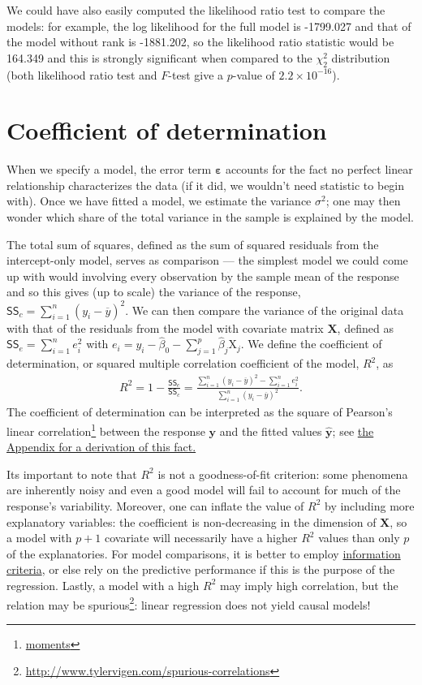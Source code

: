 \documentclass[
  11pt,
  letterpaper,
]{book}
\renewcommand{\href}[2]{#2\footnote{\url{#1}}}
\theoremstyle{definition}
\theoremstyle{definition}
\theoremstyle{definition}
\theoremstyle{definition}
\theoremstyle{remark}
\begin{document}
We could have also easily computed the likelihood ratio test to compare the models: for example, the log likelihood for the full model is -1799.027 and that of the model without rank is -1881.202, so the likelihood ratio statistic would be 164.349 and this is strongly significant when compared to the \(\chi^2_2\) distribution (both likelihood ratio test and \(F\)-test give a \(p\)-value of \(2.2 \times 10^{-16}\)).

\hypertarget{coefR2}{%
\section{Coefficient of determination}\label{coefR2}}

When we specify a model, the error term \(\boldsymbol{\varepsilon}\) accounts for the fact no perfect linear relationship characterizes the data (if it did, we wouldn't need statistic to begin with). Once we have fitted a model, we estimate the variance \(\sigma^2\); one may then wonder which share of the total variance in the sample is explained by the model.

The total sum of squares, defined as the sum of squared residuals from the intercept-only model, serves as comparison --- the simplest model we could come up with would involving every observation by the sample mean of the response and so this gives (up to scale) the variance of the response, \(\mathsf{SS}_c = \sum_{i=1}^n (y_i - \overline{y})^2\). We can then compare the variance of the original data with that of the residuals from the model with covariate matrix \(\mathbf{X}\), defined as \(\mathsf{SS}_e =\sum_{i=1}^n e_i^2\) with \(e_i = y_i - \widehat{\beta}_0 - \sum_{j=1}^p \widehat{\beta}_j\mathrm{X}_j\).
We define the coefficient of determination, or squared multiple correlation coefficient of the model, \(R^2\), as
\begin{align*}
R^2 = 1- \frac{\mathsf{SS}_e}{\mathsf{SS}_c} = \frac{\sum_{i=1}^n (y_i - \overline{y})^2- \sum_{i=1}^n e_i^2}{\sum_{i=1}^n (y_i - \overline{y})^2}.
\end{align*}
The coefficient of determination can be interpreted as the square of \href{moments}{Pearson's linear correlation} between the response \(\boldsymbol{y}\) and the fitted values \(\widehat{\boldsymbol{y}}\); see \protect\hyperlink{derivationR2}{the Appendix for a derivation of this fact.}

Its important to note that \(R^2\) is not a goodness-of-fit criterion: some phenomena are inherently noisy and even a good model will fail to account for much of the response's variability. Moreover, one can inflate the value of \(R^2\) by including more explanatory variables: the coefficient is non-decreasing in the dimension of \(\mathbf{X}\), so a model with \(p+1\) covariate will necessarily have a higher \(R^2\) values than only \(p\) of the explanatories. For model comparisons, it is better to employ \protect\hyperlink{information-criteria}{information criteria}, or else rely on the predictive performance if this is the purpose of the regression. Lastly, a model with a high \(R^2\) may imply high correlation, but \href{http://www.tylervigen.com/spurious-correlations}{the relation may be spurious}: linear regression does not yield causal models!
\end{document}
